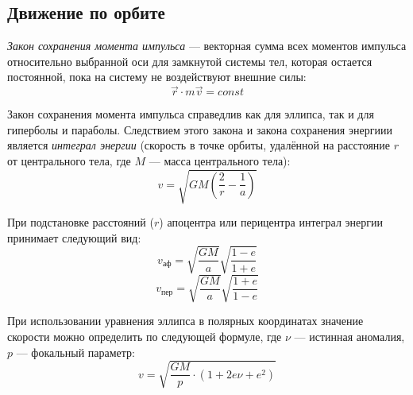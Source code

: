 \subsection{Движение по орбите}

\textit{Закон сохранения момента импульса} ---  векторная сумма всех моментов импульса относительно выбранной оси для замкнутой системы тел, которая остается постоянной, пока на систему не воздействуют внешние силы:
\begin{equation}
\vec{r} \cdot m\vec{v}=const  
\end{equation}

Закон сохранения момента импульса справедлив как для эллипса, так и для гиперболы и параболы. Следствием этого закона и закона сохранения энергиии является        \textit{ интеграл энергии} (скорость в точке орбиты, удалённой на расстояние $r$ от центрального тела, где $M$ --- масса центрального тела):
\begin{equation}v=\sqrt{GM\left(\frac2r - \frac1a\right)}
\end{equation}

При подстановке расстояний ($r$) апоцентра или перицентра интеграл энергии принимает следующий вид:
\begin{equation}v_{\text{аф}}=\sqrt{\frac{GM}{a}} \sqrt{\frac{1-e}{1+e}}
\end{equation}
\begin{equation}v_{\text{пер}}=\sqrt{\frac{GM}{a}}\sqrt{\frac{1+e}{1-e}}
\end{equation}

При использовании уравнения эллипса в полярных координатах значение скорости можно определить по следующей формуле, где $\nu$ --- истинная аномалия, $p$ --- фокальный параметр:
\begin{equation}v=\sqrt{\frac{GM}{p}\cdot(1+2e\nu+e^2)}
\end{equation}

